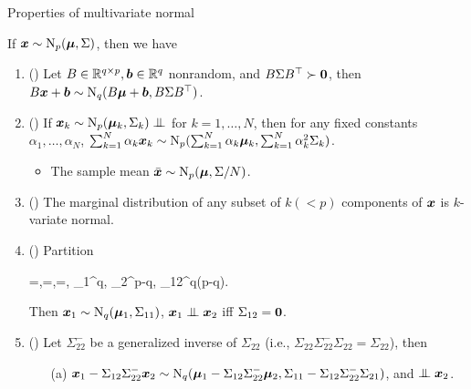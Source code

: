 \documentclass[10pt,a4paper]{book}
\begin{document}
\begin{thmbox}{Properties of multivariate normal}
	\begin{theorem}\label{thm:multi_normal_prop}
		If ${\boldsymbol x}\sim\mathrm{N}_p({\boldsymbol\mu},\Sigma)$, then we have 
		\begin{enumerate}
			\item () Let $B\in\mathbb R^{q\times p}, {\boldsymbol b}\in\mathbb R^{q}$ nonrandom, and $B\Sigma B^\top\succ {\boldsymbol 0}$, then $B{\boldsymbol x}+{\boldsymbol b} \sim \mathrm{N}_q (B{\boldsymbol\mu}+{\boldsymbol b},B\Sigma B^\top)$.  
			\item () If $\x_k\sim\rmN_p(\bam_k,\Sigma_k)\indep$ for $k=1,\ldots,N$, then for any fixed constants $\alpha_1,\ldots,\alpha_N$, $\sum_{k=1}^N\alpha_k{\boldsymbol x}_k\sim\mathrm{N}_p(\sum_{k=1}^{N}\alpha_k{\boldsymbol\mu}_k,\sum_{k=1}^{N}\alpha_k^2\Sigma_k)$.
			\begin{itemize}
				\item The sample mean $\bar{{\boldsymbol x}}\sim\mathrm{N}_p({\boldsymbol\mu},\Sigma/N)$. 
			\end{itemize}
			\item () The marginal distribution of any subset of $k(<p)$ components of ${\boldsymbol x}$ is $k$-variate normal.   
			\item () Partition
			\begin{sequation*}
				\x=\left[{\begin{array}{c}\x_{1}\\\x_{2}\end{array}}\right],\quad\boldsymbol{\mu}=,\quad\boldsymbol{\Sigma}=, \quad \x_1\in\bbR^{q}, \x_2\in\bbR^{p-q}, \Sigma_{12}\in\bbR^{q\times(p-q)}.
			\end{sequation*}    
			Then ${\boldsymbol x}_1\sim\mathrm{N}_q({\boldsymbol\mu}_1,\Sigma_{11})$, $\x_1\indep\x_2$ iff $\Sigma_{12}={\boldsymbol 0}$. 
			\item () Let $\Sigma_{22}^{-}$ be a generalized inverse of $\Sigma_{22}$ (i.e., $\Sigma_{22}\Sigma_{22}^-\Sigma_{22}=\Sigma_{22}$), then 
			\begin{itemize}
				\item[(a)] ${\boldsymbol x}_1-\Sigma_{12}\Sigma_{22}^-{\boldsymbol x}_2\sim \mathrm{N}_q({\boldsymbol\mu}_1-\Sigma_{12}\Sigma_{22}^-{\boldsymbol\mu}_2,\Sigma_{11}-\Sigma_{12}\Sigma_{22}^-\Sigma_{21})$, and $\indep \x_2$.

\end{itemize}
\end{enumerate}
\end{theorem}
\end{thmbox}
\end{document}
